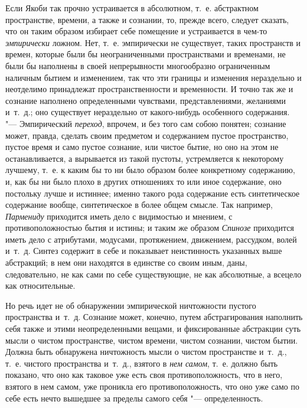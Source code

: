 Если Якоби так прочно устраивается в абсолютном, т.~е. абстрактном
пространстве, времени, а также и сознании, то, прежде всего, следует
сказать, что он таким образом избирает себе помещение и устраивается в
чем-то {\em эмпирически} ложном. Нет, т.~е. эмпирически
не существует, таких пространств и времен, которые были бы неограниченными
пространствами и временами, не были бы наполнены в своей непрерывности
многообразно ограниченным наличным бытием и изменением, так что эти границы
и изменения нераздельно и неотделимо принадлежат пространственности и
временности. И точно так же и сознание наполнено определенными чувствами,
представлениями, желаниями и~т.~д.; оно существует нераздельно от
какого-нибудь особенного содержания. "--- Эмпирический
{\em переход}, впрочем, и без того сам собою понятен;
сознание может, правда, сделать своим предметом и содержанием пустое
пространство, пустое время и само пустое сознание, или чистое бытие, но оно
на этом не останавливается, а вырывается из такой пустоты, устремляется к
некоторому лучшему, т.~е. к каким бы то ни было образом более конкретному
содержанию, и, как бы ни было плохо в других отношениях то или иное
содержание, оно постольку лучше и истиннее; именно такого рода содержание
есть синтетическое содержание вообще, синтетическое в более общем смысле.
Так например, {\em Пармениду} приходится иметь дело с
видимостью и мнением, с противоположностью бытия и истины; и таким же
образом {\em Спинозе} приходится иметь дело с
атрибутами, модусами, протяжением, движением, рассудком, волей и~т.~д.
Синтез содержит в себе и показывает неистинность указанных выше абстракций;
в нем они находятся в единстве со своим иным, даны, следовательно, не как
сами по себе существующие, не как абсолютные, а всецело как относительные.

Но речь идет не об обнаружении эмпирической ничтожности пустого пространства
и~т.~д. Сознание может, конечно, путем абстрагирования наполнить себя также
и этими неопределенными вещами, и фиксированные абстракции суть мысли о
чистом пространстве, чистом времени, чистом сознании, чистом бытии. Должна
быть обнаружена ничтожность мысли о чистом пространстве и~т.~д., т.~е.
чистого пространства и~т.~д., взятого в {\em нем
самом}, т.~е. должно быть показано, что оно как таковое уже есть своя
противоположность, что в него, взятого в нем самом, уже проникла его
противоположность, что оно уже само по себе есть нечто вышедшее за пределы
самого себя "--- определенность.


